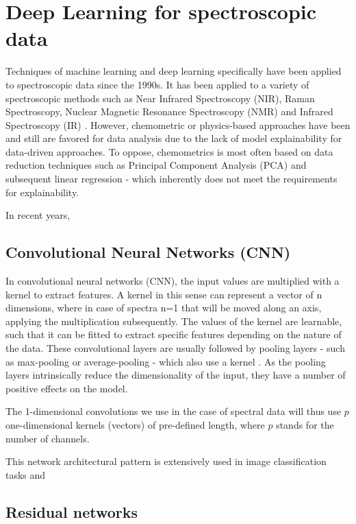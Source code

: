 \label{DL_theory}
\section{Deep Learning for spectroscopic data}

Techniques of machine learning and deep learning specifically have been applied to spectroscopic data since the 1990s. It has been applied to a variety of spectroscopic methods such as Near Infrared Spectroscopy (NIR), Raman Spectroscopy, Nuclear Magnetic Resonance Spectroscopy (NMR) and Infrared Spectroscopy (IR) . However, chemometric or physics-based approaches have been and still are favored for data analysis due to the lack of model explainability for data-driven approaches. To oppose, chemometrics is most often based on data reduction techniques such as Principal Component Analysis (PCA) and subsequent linear regression - which inherently does not meet the requirements for explainability.

In recent years, 



\subsection{Convolutional Neural Networks (CNN)}

In convolutional neural networks (CNN), the input values are multiplied with a kernel to extract features. A kernel in this sense can represent a vector of n dimensions, where in case of spectra n=1 that will be moved along an axis, applying the multiplication subsequently. The values of the kernel are learnable, such that it can be fitted to extract specific features depending on the nature of the data.
These convolutional layers are usually followed by pooling layers - such as max-pooling or average-pooling - which also use a kernel . As the pooling layers intrinsically reduce the dimensionality of the input, they have a number of positive effects on the model. 

The 1-dimensional convolutions we use in the case of spectral data will thus use $p$ one-dimensional kernels (vectors) of pre-defined length, where $p$ stands for the number of channels.

This network architectural pattern is extensively used in image classification tasks and 

\subsection{Residual networks}

